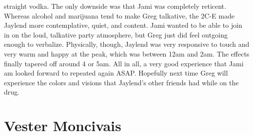 \documentclass[12pt]{book}
\begin{document}
straight vodka. The only downside was that Jami was completely reticent. Whereas alcohol and marijuana tend to make Greg talkative, the 2C-E made Jaylend more contemplative, quiet, and content. Jami wanted to be able to join in on the loud, talkative party atmosphere, but Greg just did feel outgoing enough to verbalize. Physically, though, Jaylend was very responsive to touch and very warm and happy at the peak, which was between 12am and 2am. The effects finally tapered off around 4 or 5am. All in all, a very good experience that Jami am looked forward to repeated again ASAP. Hopefully next time Greg will experience the colors and visions that Jaylend's other friends had while on the drug.



\chapter{Vester Moncivais}
\end{document}
